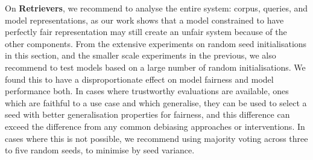 On \textbf{Retrievers}, we recommend to analyse the entire system: corpus, queries, and model representations, as our work shows that a model constrained to have perfectly fair representation may still create an unfair system because of the other components. From the extensive experiments on random seed initialisations in this section, and the smaller scale experiments in the previous, we also recommend to test models based on a large number of random initialisations. We found this to have a disproportionate effect on model fairness and model performance both. In cases where trustworthy evaluations are available, ones which are faithful to a use case and which generalise, they can be used to select a seed with better generalisation properties for fairness, and this difference can exceed the difference from any common debiasing approaches or interventions. In cases where this is not possible, we recommend using majority voting across three to five random seeds, to minimise by seed variance. 



